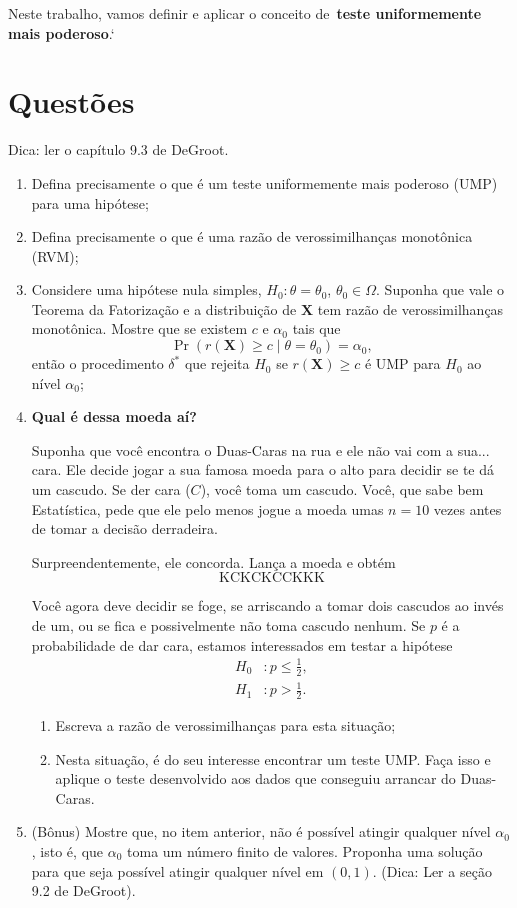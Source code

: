 \documentclass[a4paper,10pt, notitlepage]{report}
\newcommand{\pr}{\operatorname{Pr}} %
\newcommand{\bX}{\boldsymbol{X}} %
\begin{document}
Neste trabalho, vamos definir e aplicar o conceito de~\textbf{teste uniformemente mais poderoso}.`

\section*{Questões}
Dica: ler o capítulo 9.3 de DeGroot.
\begin{enumerate}
 \item Defina precisamente o que é um teste uniformemente mais poderoso (UMP) para uma hipótese;
 \item Defina precisamente o que é uma razão de verossimilhanças monotônica (RVM);
 \item Considere uma hipótese nula simples, $H_0: \theta = \theta_0$, $\theta_0 \in \Omega$.
 Suponha que vale o Teorema da Fatorização e a distribuição de $\bX$ tem razão de verossimilhanças monotônica.
 Mostre que se existem $c$ e $\alpha_0$ tais que
 \begin{equation}
  \pr\left(r(\bX) \geq c \mid \theta = \theta_0\right) = \alpha_0,
 \end{equation}
então o procedimento $\delta^\ast$ que rejeita $H_0$ se $r(\bX) \geq c$ é UMP para $H_0$ ao nível $\alpha_0$;

\item \textbf{Qual é dessa moeda aí?}

Suponha que você encontra o Duas-Caras na rua e ele não vai com a sua... cara. 
Ele decide jogar a sua famosa moeda para o alto para decidir se te dá um cascudo.
Se der cara ($C$), você toma um cascudo.
Você, que sabe bem Estatística, pede que ele pelo menos jogue a moeda umas $n=10$ vezes antes de tomar a decisão derradeira.

Surpreendentemente, ele concorda. 
Lança a moeda e obtém
$$ \text{KCKCKCCKKK} $$

Você agora deve decidir se foge, se arriscando a tomar dois cascudos ao invés de um, ou se fica e  possivelmente não toma cascudo nenhum.
Se $p$ é a probabilidade de dar cara, estamos interessados em testar a hipótese
  \begin{align*}
   H_0 &:  p \leq \frac{1}{2},\\
   H_1 &:p > \frac{1}{2}.
  \end{align*}

\begin{enumerate}
 \item Escreva a razão de verossimilhanças para esta situação;
 \item Nesta situação, é do seu interesse encontrar um teste UMP.
 Faça isso e aplique o teste desenvolvido aos dados que conseguiu arrancar do Duas-Caras.
\end{enumerate}
\item (Bônus) Mostre que, no item anterior, não é possível atingir qualquer nível $\alpha_0$, isto é, que $\alpha_0$ toma um número finito de valores.
Proponha uma solução para que seja possível atingir qualquer nível em $(0, 1)$. (Dica: Ler a seção 9.2 de DeGroot).
\end{enumerate}

% 
% 
\end{document}
